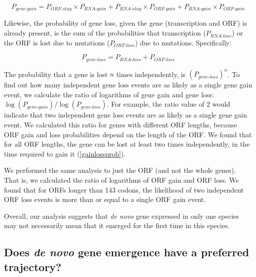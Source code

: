 \documentclass[12pt,a4paper]{article}
\begin{document}
\begin{equation}
P_\textit{gene-gain} = P_\textit{ORF-stay}\times P_\textit{RNA-gain} + P_\textit{RNA-stay}\times P_\textit{ORF-gain} + P_\textit{RNA-gain}\times P_\textit{ORF-gain}
\label{genegaineq}
\end{equation}

Likewise, the probability of gene loss, given the gene (transcription and ORF) is already present, is the sum of the probabilities that transcription ($P_\textit{RNA-loss}$) or the ORF is lost due to mutations ($P_\textit{ORF-loss}$) due to mutations. Specifically:

\begin{equation}
P_\textit{gene-loss} = P_\textit{RNA-loss} + P_\textit{ORF-loss}
\label{genelosseq}
\end{equation}

The probability that a gene is lost $n$ times independently, is $(P_\textit{gene-loss})^{n}$. To find out how many independent gene loss events are as likely as a single gene gain event, we calculate the ratio of logarithms of gene gain and gene loss: $\log(P_\textit{gene-gain})/\log(P_\textit{gene-loss})$. For example, the ratio value of 2 would indicate that two independent gene loss events are as likely as a single gene gain event. We calculated this ratio for genes with different ORF lengths, because ORF gain and loss probabilities depend on the length of the ORF. We found that for all ORF lengths, the gene can be lost at least two times independently, in the time required to gain it (\autoref{gainlossprob}). 

We performed the same analysis to just the ORF (and not the whole genes). That is, we calculated the ratio of logarithms of ORF gain and ORF loss. We found that for ORFs longer than 143 codons, the likelihood of two independent ORF loss events is more than or equal to a single ORF gain event. 

Overall, our analysis suggests that \textit{de novo} gene expressed in only one species may not necessarily mean that it emerged for the first time in this species. 

\subsection{Does \textit{de novo} gene emergence have a preferred trajectory?}
\end{document}
